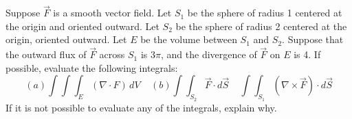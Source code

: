 \documentclass[12pt]{exam}
\begin{document}
\begin{questions}
\clearpage

\question Suppose $\overrightarrow{F}$ is a smooth vector field. Let $S_1$ be the sphere of radius 1 centered at the origin and oriented outward. Let $S_2$ be the sphere of radius 2 centered at the origin, oriented outward. Let $E$ be the volume
between $S_1$ and $S_2$. Suppose that the outward flux of $\overrightarrow{F}$ across $S_1$ is $3\pi$, and the divergence of $\overrightarrow{F}$ on $E$
is 4. If possible, evaluate the following integrals:
    \[ (a) \int\int\int_E(\nabla \cdot F)\, dV \ \ \ \ \ (b) \int\int_{S_2}\overrightarrow{F} \cdot d\overrightarrow{S} \ \ \ \ \ \int\int_{S_1} \left(\nabla \times \overrightarrow{F}\right) \cdot d\overrightarrow{S} \]
    If it is not possible to evaluate any of the integrals, explain why.
    \begin{solution}
    \end{solution}
    

\end{questions}
\end{document}
